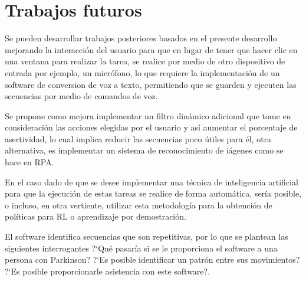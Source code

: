 \section{Trabajos futuros}


Se pueden desarrollar trabajos posteriores basados en el presente desarrollo
 mejorando la interacci\'on del usuario para que en lugar de tener que hacer 
 clic en una ventana para realizar la tarea, se realice por medio de otro 
 dispositivo de entrada por ejemplo, un micr\'ofono, lo que requiere la 
 implementaci\'on de un software de conversion de voz a texto, permitiendo que 
 se guarden y ejecuten las secuencias por medio de comandos de voz. 
 

Se propone como mejora implementar un filtro din\'amico adicional que tome en 
 consideraci\'on las acciones elegidas por el usuario y as\'i aumentar el 
 porcentaje de asertividad, lo cual implica reducir las secuencias poco
  \'utiles para \'el, otra alternativa, es implementar un sistema de
 reconocimiento de i\'agenes como se hace en RPA. 

 
En el caso dado de que se desee implementar una t\'ecnica de inteligencia  
 artificial para que la ejecuci\'on de estas tareas se realice de forma 
 autom\'atica, ser\'ia posible, o incluso, en otra vertiente, utilizar esta 
 metodolog\'ia para la obtenci\'on de pol\'iticas para RL o aprendizaje por 
 demostraci\'on.


El software identifica secuencias que son repetitivas, por lo que se 
 plantean las siguientes interrogantes ?`Qu\'e pasar\'ia si se le 
 proporciona el software a una persona con Parkinson?  
 ?`Es posible identificar un patr\'on entre sus movimientos? 
 ?`Es posible proporcionarle asistencia con este software?.
